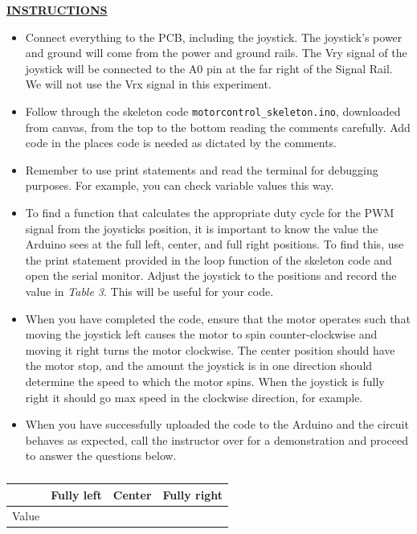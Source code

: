 \documentclass[12pt]{article}
\begin{document}
\textbf{\underline{INSTRUCTIONS}}
\begin{itemize}
    \item Connect everything to the PCB, including the joystick. The joystick's power and ground will come from the power and ground rails. The Vry signal of the joystick will be connected to the A0 pin at the far right of the Signal Rail. We will not use the Vrx signal in this experiment.
    \item Follow through the skeleton code \texttt{motorcontrol\_skeleton.ino}, downloaded from canvas, from the top to the bottom reading the comments carefully. Add code in the places code is needed as dictated by the comments.
    \item Remember to use print statements and read the terminal for debugging purposes. For example, you can check variable values this way.
    \item To find a function that calculates the appropriate duty cycle for the PWM signal from the joysticks position, it is important to know the value the Arduino sees at the full left, center, and full right positions. To find this, use the print statement provided in the loop function of the skeleton code and open the serial monitor. Adjust the joystick to the positions and record the value in \textit{Table 3}. This will be useful for your code.
    \item When you have completed the code, ensure that the motor operates such that moving the joystick left causes the motor to spin counter-clockwise and moving it right turns the motor clockwise. The center position should have the motor stop, and the amount the joystick is in one direction should determine the speed to which the motor spins. When the joystick is fully right it should go max speed in the clockwise direction, for example.
    \item When you have successfully uploaded the code to the Arduino and the circuit behaves as expected, call the instructor over for a demonstration and proceed to answer the questions below.
\end{itemize}

\begin{table}[H]
    \centering
    \begin{tabular}{|c|c|c|c|} %
        \hline
         &Fully left &  Center & Fully right \\ \hline \hline
         Value&    &     &          \\ \hline %
    \end{tabular}
    \caption{}
\end{table}
\end{document}
